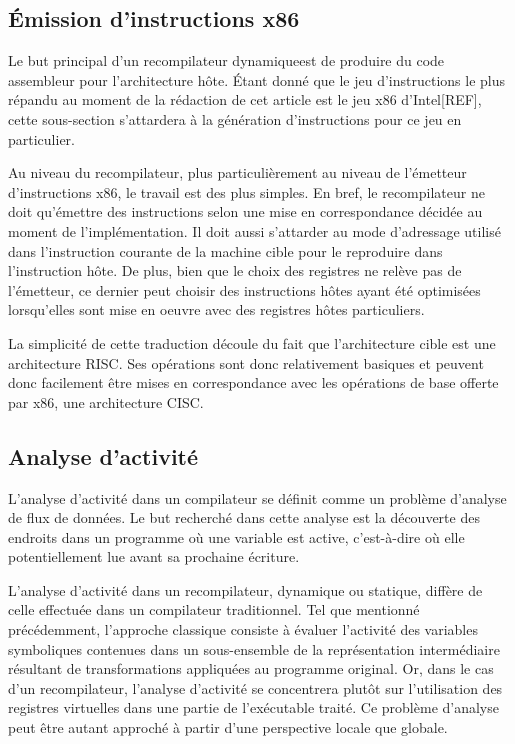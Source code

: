 \documentclass{article} %
\begin{document}
\subsection{Émission d'instructions x86}
Le but principal d'un recompilateur dynamiqueest de produire du code assembleur pour l'architecture hôte. Étant donné que le jeu d'instructions le plus répandu au moment de la rédaction de cet article est le jeu x86 d'Intel[REF], cette sous-section s'attardera à la génération d'instructions pour ce jeu en particulier. 

Au niveau du recompilateur, plus particulièrement au niveau de l'émetteur d'instructions x86, le travail est des plus simples. En bref, le recompilateur ne doit qu'émettre des instructions selon une mise en correspondance décidée au moment de l'implémentation. Il doit aussi s'attarder au mode d'adressage utilisé dans l'instruction courante de la machine cible pour le reproduire dans l'instruction hôte. De plus, bien que le choix des registres ne relève pas de l'émetteur, ce dernier peut choisir des instructions hôtes ayant été optimisées lorsqu'elles sont mise en oeuvre avec des registres hôtes particuliers. 

La simplicité de cette traduction découle du fait que l'architecture cible est une architecture RISC. Ses opérations sont donc relativement basiques et peuvent donc facilement être mises en correspondance avec les opérations de base offerte par x86, une architecture CISC. 

\subsection{Analyse d'activité}
L'analyse d'activité dans un compilateur se définit comme un problème d'analyse de flux de données. Le but recherché dans cette analyse est la découverte des endroits dans un programme où une variable est active, c'est-à-dire où elle potentiellement lue avant sa prochaine écriture.

L'analyse d'activité dans un recompilateur, dynamique ou statique, diffère de celle effectuée dans un compilateur traditionnel. Tel que mentionné précédemment, l'approche classique consiste à évaluer l'activité des variables symboliques contenues dans un sous-ensemble de la représentation intermédiaire résultant de transformations appliquées au programme original. Or, dans le cas d'un recompilateur, l'analyse d'activité se concentrera plutôt sur l'utilisation des registres virtuelles dans une partie de l'exécutable traité. Ce problème d'analyse peut être autant approché à partir d'une perspective locale que globale.
\end{document}
